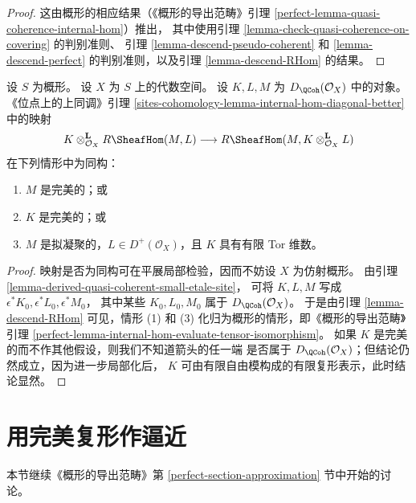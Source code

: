 \begin{proof}
这由概形的相应结果（《概形的导出范畴》引理
\ref{perfect-lemma-quasi-coherence-internal-hom}）推出，
其中使用引理 \ref{lemma-check-quasi-coherence-on-covering} 的判别准则、
引理 \ref{lemma-descend-pseudo-coherent} 和
\ref{lemma-descend-perfect} 的判别准则，以及引理
\ref{lemma-descend-RHom} 的结果。
\end{proof}

\begin{lemma}
\label{lemma-internal-hom-evaluate-tensor-isomorphism}
设 $S$ 为概形。
设 $X$ 为 $S$ 上的代数空间。
设 $K, L, M$ 为 $D_\QCoh(\mathcal{O}_X)$ 中的对象。
《位点上的上同调》引理
\ref{sites-cohomology-lemma-internal-hom-diagonal-better} 中的映射
$$
K \otimes_{\mathcal{O}_X}^\mathbf{L} R\SheafHom(M, L)
\longrightarrow
R\SheafHom(M, K \otimes_{\mathcal{O}_X}^\mathbf{L} L)
$$
在下列情形中为同构：
\begin{enumerate}
\item $M$ 是完美的；或
\item $K$ 是完美的；或
\item $M$ 是拟凝聚的，$L \in D^+(\mathcal{O}_X)$，且 $K$ 具有有限
Tor 维数。
\end{enumerate}
\end{lemma}

\begin{proof}
映射是否为同构可在平展局部检验，因而不妨设 $X$ 为仿射概形。
由引理 \ref{lemma-derived-quasi-coherent-small-etale-site}，
可将 $K, L, M$ 写成 $\epsilon^*K_0, \epsilon^*L_0, \epsilon^*M_0$，
其中某些 $K_0, L_0, M_0$ 属于 $D_\QCoh(\mathcal{O}_X)$。
于是由引理 \ref{lemma-descend-RHom} 可见，情形 (1) 和 (3)
化归为概形的情形，即《概形的导出范畴》引理
\ref{perfect-lemma-internal-hom-evaluate-tensor-isomorphism}。
如果 $K$ 是完美的而不作其他假设，则我们不知道箭头的任一端
是否属于 $D_\QCoh(\mathcal{O}_X)$；但结论仍然成立，因为进一步局部化后，
$K$ 可由有限自由模构成的有限复形表示，此时结论显然。
\end{proof}









\section{用完美复形作逼近}
\label{section-approximation}

\noindent
本节继续《概形的导出范畴》第
\ref{perfect-section-approximation} 节中开始的讨论。

